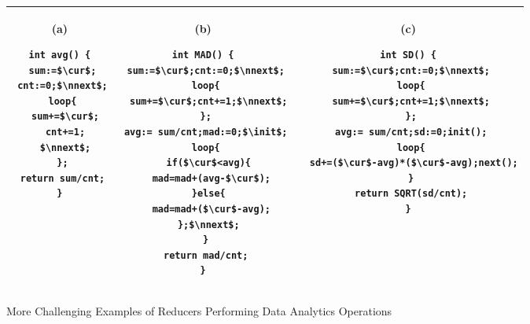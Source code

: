 \vspace{-1cm}
\begin{figure}
	\centering
	\lstset{language=C,
		basicstyle=\ttfamily\scriptsize}
	\begin{tabular}{|c|c|c|}
		\hline
		\begin{minipage}[t]{0.25\textwidth}
			(a)
			\begin{lstlisting}[mathescape=true]
int avg() {
 sum:=$\cur$;
 cnt:=0;$\nnext$;
 loop{
  sum+=$\cur$;
  cnt+=1;
  $\nnext$;
 };
 return sum/cnt;
}
			\end{lstlisting}
		\end{minipage}&
		\begin{minipage}[t]{0.35\textwidth}
			(b)
\begin{lstlisting}[mathescape=true]
int MAD() {
 sum:=$\cur$;cnt:=0;$\nnext$;
 loop{
  sum+=$\cur$;cnt+=1;$\nnext$;
 };
 avg:= sum/cnt;mad:=0;$\init$;
 loop{
  if($\cur$<avg){
   mad=mad+(avg-$\cur$);
  }else{
   mad=mad+($\cur$-avg);
  };$\nnext$;
 }
 return mad/cnt;
}
\end{lstlisting}
		\end{minipage}&
		\begin{minipage}[t]{0.4\textwidth}
			(c)
			\begin{lstlisting}[mathescape=true]
int SD() {
 sum:=$\cur$;cnt:=0;$\nnext$;
 loop{
 sum+=$\cur$;cnt+=1;$\nnext$;
 };
 avg:= sum/cnt;sd:=0;init();
 loop{
  sd+=($\cur$-avg)*($\cur$-avg);next();
 }
 return SQRT(sd/cnt);
}
			\end{lstlisting}
		\end{minipage}\\
		\hline		
	\end{tabular}
	\caption{More Challenging Examples of Reducers Performing Data Analytics Operations}
	\label{fig:examples2}
\end{figure}
\vspace{-0.5cm}